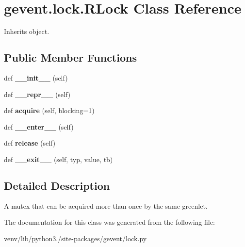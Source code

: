 \hypertarget{classgevent_1_1lock_1_1_r_lock}{}\section{gevent.\+lock.\+R\+Lock Class Reference}
\label{classgevent_1_1lock_1_1_r_lock}


Inherits object.

\subsection*{Public Member Functions}
\begin{DoxyCompactItemize}
\item 
\mbox{\label{classgevent_1_1lock_1_1_r_lock_ad56d5b451876f1c3fd559553c60c1729}} 
def {\bfseries \+\_\+\+\_\+init\+\_\+\+\_\+} (self)
\item 
\mbox{\label{classgevent_1_1lock_1_1_r_lock_a2ae4a05abfc4179a286d2c70706fec5f}} 
def {\bfseries \+\_\+\+\_\+repr\+\_\+\+\_\+} (self)
\item 
\mbox{\label{classgevent_1_1lock_1_1_r_lock_a9b49f788b6abec7e5a09a047505c807a}} 
def {\bfseries acquire} (self, blocking=1)
\item 
\mbox{\label{classgevent_1_1lock_1_1_r_lock_a6133491052f510e21068b06894e4f714}} 
def {\bfseries \+\_\+\+\_\+enter\+\_\+\+\_\+} (self)
\item 
\mbox{\label{classgevent_1_1lock_1_1_r_lock_aa4562d55481bd194ed71bb5eed9bb95b}} 
def {\bfseries release} (self)
\item 
\mbox{\label{classgevent_1_1lock_1_1_r_lock_a787d26a502208632ae208d7edad3812a}} 
def {\bfseries \+\_\+\+\_\+exit\+\_\+\+\_\+} (self, typ, value, tb)
\end{DoxyCompactItemize}


\subsection{Detailed Description}
\begin{DoxyVerb}A mutex that can be acquired more than once by the same greenlet.
\end{DoxyVerb}
 

The documentation for this class was generated from the following file\+:\begin{DoxyCompactItemize}
\item 
venv/lib/python3./site-\/packages/gevent/lock.\+py\end{DoxyCompactItemize}
